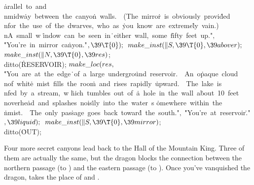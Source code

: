 \.{arallel\ to\ and\\nmidw}\)\.{ay\ between\ the\ canyo}\)\.{n\ walls.\ \ (The\
mirro}\)\.{r\ is\ obviously\ provi}\)\.{ded\\nfor\ the\ use\ of\ }\)\.{the\
dwarves,\ who\ as\ }\)\.{you\ know\ are\ extreme}\)\.{ly\ vain.)\\nA\ small\ w}%
\)\.{indow\ can\ be\ seen\ in}\)\.{\ either\ wall,\ some\ f}\)\.{ifty\ feet\
up."}${},{}$\6
\.{"You're\ in\ mirror\ ca}\)\.{nyon."}${},\39\T{0});{}$\6
${}\\{make\_inst}(\|S,\39\T{0},\39\\{abover});{}$\6
${}\\{make\_inst}(\|N,\39\T{0},\39\\{res}){}$;\5
\\{ditto}(\.{RESERVOIR});\7
${}\\{make\_loc}(\\{res},{}$\6
\.{"You\ are\ at\ the\ edge}\)\.{\ of\ a\ large\ undergro}\)\.{und\ reservoir.\
\ An\ o}\)\.{paque\ cloud\\nof\ whit}\)\.{e\ mist\ fills\ the\ roo}\)\.{m\ and\
rises\ rapidly\ }\)\.{upward.\ \ The\ lake\ is}\)\.{\\nfed\ by\ a\ stream,\ w}%
\)\.{hich\ tumbles\ out\ of\ }\)\.{a\ hole\ in\ the\ wall\ a}\)\.{bout\ 10\
feet\\noverhe}\)\.{ad\ and\ splashes\ nois}\)\.{ily\ into\ the\ water\ s}\)%
\.{omewhere\ within\ the\\}\)\.{nmist.\ \ The\ only\ pas}\)\.{sage\ goes\ back\
towar}\)\.{d\ the\ south."}${},{}$\6
\.{"You're\ at\ reservoir}\)\.{."}${},\39\\{liquid});{}$\6
${}\\{make\_inst}(\|S,\39\T{0},\39\\{mirror}){}$;\5
\\{ditto}(\.{OUT});\par
\fi

\M[1765 advent.w]{53}Four more secret canyons lead back to the Hall of the
Mountain King.
Three of them are actually the same, but the dragon blocks the
connection between the northern passage (to ) and the
eastern passage (to ). Once you've vanquished the dragon,
 takes the place of  and .

